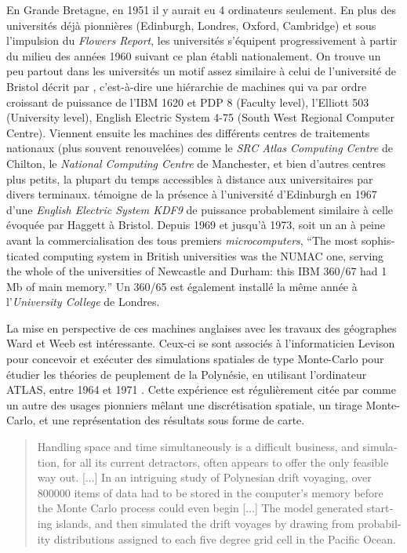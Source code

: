 \medskip

En Grande Bretagne, en 1951 il y aurait eu 4 ordinateurs seulement. En plus des universités déjà pionnières (Edinburgh, Londres, Oxford, Cambridge) et sous l'impulsion du \textit{Flowers Report}, les universités s'équipent progressivement à partir du milieu des années 1960 suivant ce plan établi nationalement. On trouve un peu partout dans les universités  un motif assez similaire à celui de l'université de Bristol décrit par \textcite{Haggett1969}, c'est-à-dire une hiérarchie de machines qui va par ordre croissant de puissance de l'IBM 1620 et PDP 8 (Faculty level), l'Elliott 503 (University level), English Electric System 4-75 (South West Regional Computer Centre). Viennent ensuite les machines des différents centres de traitements nationaux (plus souvent renouvelées) comme le \textit{SRC Atlas Computing Centre} de Chilton, le \textit{National Computing Centre} de Manchester, et bien d'autres centres plus petits, la plupart du temps accessibles à distance aux universitaires par divers terminaux. \textcite{Rhind1989} témoigne de la présence à l'université d'Edinburgh en 1967 d'une \textit{English Electric System KDF9} de puissance probablement similaire à celle évoquée par Haggett à Bristol. Depuis 1969 et jusqu'à 1973, soit un an à peine avant la commercialisation des tous premiers \textit{microcomputers}, \foreignquote{english}{The most sophisticated computing system in British universities was the NUMAC one, serving the whole of the universities of Newcastle and Durham: this IBM 360/67 had 1 Mb of main memory.}  Un 360/65 est également installé la même année à l'\textit{University College} de Londres.

La mise en perspective de ces machines anglaises avec les travaux des géographes Ward et Weeb est intéressante. Ceux-ci se sont associés à l'informaticien Levison pour concevoir et exécuter des simulations spatiales de type Monte-Carlo pour étudier les théories de peuplement de la Polynésie, en utilisant l'ordinateur ATLAS, entre 1964 et 1971 \autocites{Montillier1974, Ward1973}. Cette expérience est régulièrement citée par \textcites{Gould1970, Gould1975} comme un autre des usages pionniers mêlant une discrétisation spatiale, un tirage Monte-Carlo, et une représentation des résultats sous forme de carte.

\foreignblockquote{english}[\cite{Gould1970}]{Handling space and time simultaneously is a difficult business, and simulation, for all its current detractors, often appears to offer the only feasible way out. [...] In an intriguing study of Polynesian drift voyaging, over 800000 items of data had to be stored in the computer’s memory before the Monte Carlo process could even begin [...] The model generated starting islands, and then simulated the drift voyages by drawing from probability distributions assigned to each five degree grid cell in the Pacific Ocean.}

